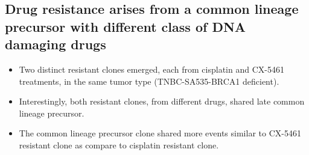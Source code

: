 \subsection{Drug resistance arises from a common lineage precursor with different class of DNA damaging drugs}
\begin{itemize} 
  \item  Two distinct resistant clones emerged, each from cisplatin and CX-5461 treatments, in the same tumor type (TNBC-SA535-BRCA1 deficient).
 
  \item Interestingly, both resistant clones, from different drugs, shared late common lineage precursor.
  
  \item The common lineage precursor clone shared more events similar to CX-5461 resistant clone as compare to cisplatin resistant clone. 
   


\end{itemize}






